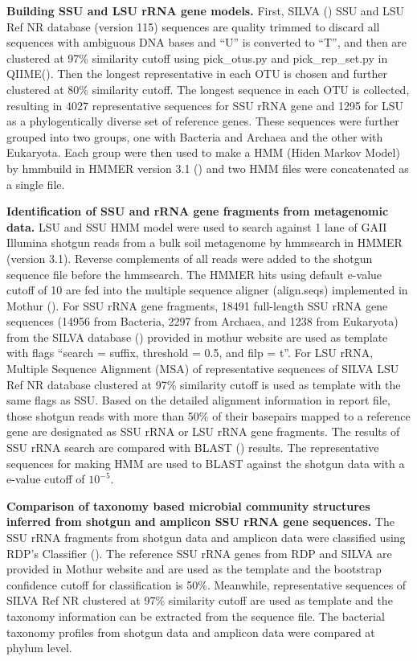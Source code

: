 \documentclass[12pt]{article}
\begin{document}
  {\bf Building SSU and LSU rRNA gene models. }
First, SILVA (\cite{silva2013}) SSU and LSU Ref NR database (version 115) sequences are quality trimmed to discard all sequences with ambiguous DNA bases and ``U'' is converted to ``T'', and then are clustered at 97\% similarity cutoff using pick\_otus.py and pick\_rep\_set.py in QIIME(\cite{qiime}). Then the longest representative in each OTU is chosen and further clustered at 80\% similarity cutoff. The longest sequence in each OTU is collected, resulting in 4027 representative sequences for SSU rRNA gene and 1295 for LSU as a phylogentically diverse set of reference genes. These sequences were further grouped into two groups, one with Bacteria and Archaea and the other with Eukaryota. Each group were then used to make a HMM (Hiden Markov Model) by hmmbuild in HMMER version 3.1 (\cite{hmmer3}) and two HMM files were concatenated as a single file.

  {\bf Identification of SSU and rRNA gene fragments from metagenomic data. }
  LSU and SSU HMM model were used to search against 1 lane of GAII Illumina shotgun reads from a bulk soil metagenome by hmmsearch in HMMER (version 3.1). Reverse complements of all reads were added to the shotgun sequence file before the hmmsearch. The HMMER hits using default e-value cutoff of 10 are fed into the multiple sequence aligner (align.seqs) implemented in Mothur (\cite{mothuraligner2009}). For SSU rRNA gene fragments, 18491 full-length SSU rRNA gene sequences (14956 from Bacteria, 2297 from Archaea, and 1238 from Eukaryota) from the SILVA database (\cite{silva2013}) provided in mothur website are used as template with flags ``search = suffix, threshold = 0.5, and filp = t''.  For LSU rRNA, Multiple Sequence Alignment (MSA) of representative sequences of SILVA LSU Ref NR database clustered at 97\% similarity cutoff is used as template with the same flags as SSU. Based on the detailed alignment information in report file, those shotgun reads with more than 50\% of their basepairs mapped to a reference gene are designated as SSU rRNA or LSU rRNA gene fragments. The results of SSU rRNA search are compared with BLAST (\cite{blast}) results. The representative sequences for making HMM are used to BLAST against the shotgun data with a e-value cutoff of $10^{-5}$.

  {\bf Comparison of taxonomy based microbial community structures inferred from shotgun and amplicon SSU rRNA gene sequences. }
The SSU rRNA fragments from shotgun data and amplicon data were classified using RDP’s Classifier (\cite{rdpclassifier}). The reference SSU rRNA genes from RDP and SILVA are provided in Mothur website and are used as the template and the bootstrap confidence cutoff for classification is 50\%. Meanwhile, representative sequences of SILVA Ref NR clustered at 97\% similarity cutoff are used as template and the taxonomy information can be extracted from the sequence file. The bacterial taxonomy profiles from shotgun data and amplicon data were compared at phylum level.
\end{document}
